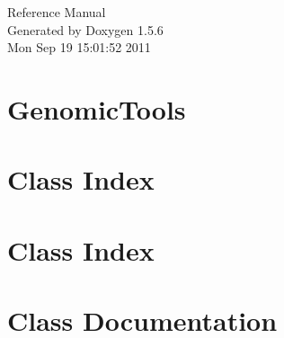 \documentclass[a4paper]{book}
\begin{document}
\begin{titlepage}
\vspace*{7cm}
\begin{center}
{\Large Reference Manual}\\
\vspace*{1cm}
{\large Generated by Doxygen 1.5.6}\\
\vspace*{0.5cm}
{\small Mon Sep 19 15:01:52 2011}\\
\end{center}
\end{titlepage}
\clearemptydoublepage
{}
\tableofcontents
\clearemptydoublepage
{}
\chapter{GenomicTools}
\label{index}\hypertarget{index}{}
\chapter{Class Index}

\chapter{Class Index}

\chapter{Class Documentation}

















\printindex
\end{document}
